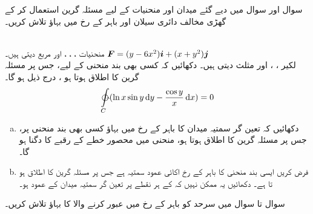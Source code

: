 سوال   اور  سوال  میں دیے گئے میدان   اور منحنیات   کے لیے  مسئلہ گرین استعمال کر کے  گھڑی مخالف دائری سیلان اور باہر کے  رخ  میں بہاؤ  تلاش کریں۔

\quad {}\\ 
منحنیات ، ، ، اور  مربع   دیتی ہیں۔
\quad
\({{\boldsymbol{F}}}=(y-6x^2){\boldsymbol{i}}+(x+y^2){\boldsymbol{j}}\)\\
لکیر ، ، اور  مثلث  دیتی ہیں۔
 \quad 
دکھائیں کہ کسی بھی بند  منحنی    کے لیے، جس پر مسئلہ گرین کا اطلاق ہوتا ہو ، درج ذیل ہو گا۔
\[\ointctrclockwise\limits_C (\ln x\sin y \dif y-\frac{\cos y}{x}\dif x)=0\]
\begin{enumerate}[a.]
\item
{}\quad
دکھائیں کہ   تعین گر سمتیہ میدان  کا باہر    کے رخ  میں بہاؤ کسی بھی بند منحنی پر، جس پر مسئلہ گرین کا اطلاق ہوتا ہو،  منحنی میں محصور  خطے کے رقبے کا دگنا ہو گا۔
\item
فرض کریں   ایسی بند  منحنی    کا باہر  کے رخ    اکائی  عمود سمتیہ ہے جس پر مسئلہ گرین کا اطلاق ہو تا ہے۔  دکھائیں یہ ممکن نہیں کہ   کے ہر نقطے پر    تعین گر سمتیہ  میدان   کے  عمود ہو۔
\end{enumerate}

سوال     تا  سوال   میں  سرحد  کو باہر  کے رخ   میں عبور کرنے والا    کا بہاؤ تلاش کریں۔

